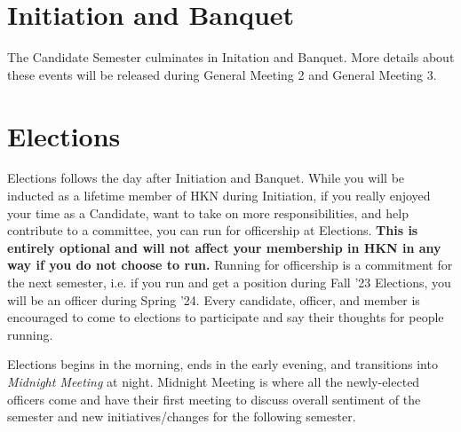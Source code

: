 \documentclass[11pt, article, oneside]{memoir}
\begin{document}
    \section{Initiation and Banquet}
        The Candidate Semester culminates in Initation and Banquet. More details about these events will be released during General Meeting 2 and General Meeting 3.


    \section{Elections}
        Elections follows the day after Initiation and Banquet. While you will be inducted as a lifetime member of HKN during Initiation, if you really enjoyed your time as a Candidate, want to take on more responsibilities, and help contribute to a committee, you can run for officership at Elections. \textbf{This is entirely optional and will not affect your membership in HKN in any way if you do not choose to run.} Running for officership is a commitment for the next semester, i.e. if you run and get a position during Fall '23 Elections, you will be an officer during Spring '24. Every candidate, officer, and member is encouraged to come to elections to participate and say their thoughts for people running.
        
        \bigbreak

        Elections begins in the morning, ends in the early evening, and transitions into \emph{Midnight Meeting} at night. Midnight Meeting is where all the newly-elected officers come and have their first meeting to discuss overall sentiment of the semester and new initiatives/changes for the following semester.

        \bigbreak
        
\end{document}
